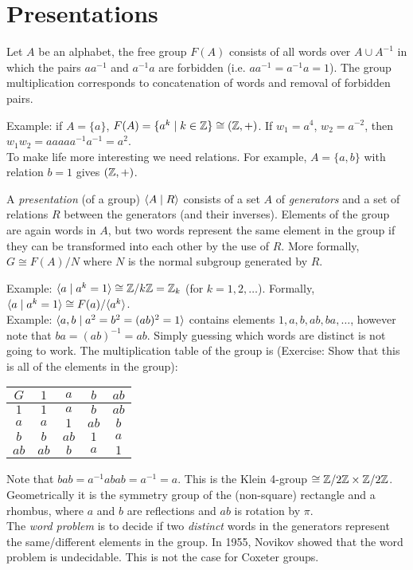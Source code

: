 \section{Presentations}

Let $A$ be an alphabet, the free group $F(A)$ consists of all words over $A
\cup A^{-1}$ in which the pairs $aa^{-1}$ and $a^{-1}a$ are forbidden (i.e.
$aa^{-1}=a^{-1}a=1$). The group multiplication corresponds to concatenation of
words and removal of forbidden pairs.

Example: if $A = \{a\}$, $F(A) = \{a^k \mid k \in \mathbb{Z}\} \cong (\mathbb{Z},+)$.
If $w_1 = a^4$, $w_2 = a^{-2}$, then $w_1 w_2 = a a a a a^{-1} a^{-1} = a^2$.
\\

To make life more interesting we need relations.
For example, $A = \{a, b\}$ with relation $b=1$ gives $(\mathbb{Z}, +)$.

A {\em presentation} (of a group) $\langle A \mid R \rangle$ consists of
a set $A$ of {\em generators} and a set of relations $R$ between the generators
(and their inverses). Elements of the group are again words in $A$, but two
words represent the same element in the group if they can be transformed into
each other by the use of $R$. More formally, $G \cong F(A)/N$ where $N$ is the
normal subgroup generated by $R$.

Example: $\langle a \mid a^k = 1 \rangle \cong \mathbb{Z}/k\mathbb{Z} = \mathbb{Z}_k$
(for $k = 1, 2, \dots$). Formally, $\langle a \mid a^k = 1 \rangle \cong F(a)/\langle a^k \rangle$.
\\

Example: $\langle a,b \mid a^2 = b^2 = (ab)^2 = 1 \rangle$ contains elements
$1, a, b, ab, ba, \dots$, however note that $ba = (ab)^{-1} = ab$.
Simply guessing which words are distinct is not going to work.
The multiplication table of the group is (Exercise: Show that this is all of
the elements in the group):

\begin{tabular}{c||c|c|c|c}
$G$ & $1$ & $a$ & $b$ & $ab$ \\
\hline
\hline
$1$ & $1$ & $a$ & $b$ & $ab$ \\ \hline
$a$ & $a$ & $1$ & $ab$ & $b$ \\ \hline
$b$ & $b$ & $ab$ & $1$ & $a$ \\ \hline
$ab$ & $ab$ & $b$ & $a$ & $1$
\end{tabular}

Note that $bab = a^{-1}abab = a^{-1} = a$. This is the Klein 4-group
$\cong \mathbb{Z}/2\mathbb{Z} \times \mathbb{Z}/2\mathbb{Z}$. Geometrically it is the symmetry group of the
(non-square) rectangle and a rhombus,
where $a$ and $b$ are reflections and $ab$ is rotation by $\pi$.
\\

The {\em word problem} is to decide if two {\em distinct} words in the
generators represent the same/different elements in the group.
In 1955, Novikov showed that the word problem is undecidable. This is not the
case for Coxeter groups.
